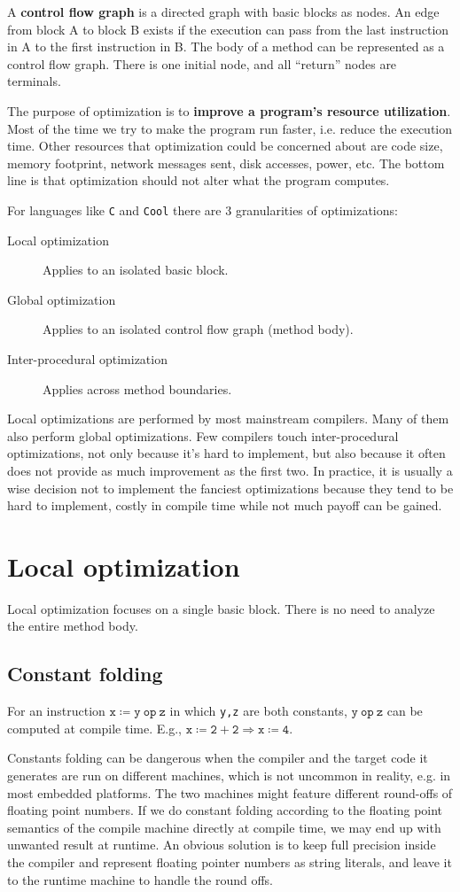 A \textbf{control flow graph} is a directed graph with basic blocks as nodes. An edge from block A to block B exists if the execution can pass from the last instruction in A to the first instruction in B. The body of a method can be represented as a control flow graph. There is one initial node, and all ``return'' nodes are terminals. 

The purpose of optimization is to \textbf{improve a program's resource utilization}. Most of the time we try to make the program run faster, i.e. reduce the execution time. Other resources that optimization could be concerned about are code size, memory footprint, network messages sent, disk accesses, power, etc. The bottom line is that optimization should not alter what the program computes.

For languages like \texttt{C} and \texttt{Cool} there are 3 granularities of optimizations:
\begin{description}
\item[Local optimization]Applies to an isolated basic block.
\item[Global optimization]Applies to an isolated control flow graph (method body).
\item[Inter-procedural optimization]Applies across method boundaries.
\end{description}
Local optimizations are performed by most mainstream compilers. Many of them also perform global optimizations. Few compilers touch inter-procedural optimizations, not only because it's hard to implement, but also because it often does not provide as much improvement as the first two. In practice, it is usually a wise decision not to implement the fanciest optimizations because they tend to be hard to implement, costly in compile time while not much payoff can be gained.
\section{Local optimization}
Local optimization focuses on a single basic block. There is no need to analyze the entire method body.
\subsection{Constant folding}
For an instruction $\mathtt{x\coloneqq y\:op\:z}$ in which \texttt{y,z} are both constants, $\mathtt{y\:op\:z}$ can be computed at compile time. E.g., $\mathtt{x\coloneqq 2 + 2\Rightarrow x\coloneqq 4}$.

Constants folding can be dangerous when the compiler and the target code it generates are run on different machines, which is not uncommon in reality, e.g. in most embedded platforms. The two machines might feature different round-offs of floating point numbers. If we do constant folding according to the floating point semantics of the compile machine directly at compile time, we may end up with unwanted result at runtime. An obvious solution is to keep full precision inside the compiler and represent floating pointer numbers as string literals, and leave it to the runtime machine to handle the round offs.
